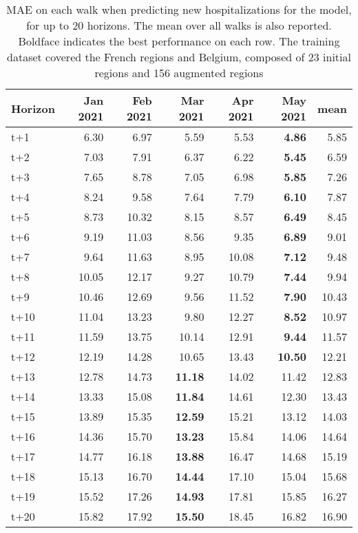 \begin{table}[H]
\centering
\caption{MAE on each walk when predicting new hospitalizations for the model, for up to 20 horizons. The mean over all walks is also reported. Boldface indicates the best performance on each row. The training dataset covered the French regions and Belgium, composed of 23 initial regions and 156 augmented regions }
\label{tab:MAE_walk_assembly}
\begin{tabular}{lrrrrrr}
\toprule
Horizon &  Jan 2021 &  Feb 2021 &  Mar 2021 &  Apr 2021 &  May 2021 &  mean \\
\midrule
t+1  & 6.30  & 6.97  & 5.59  & 5.53  & \textbf{4.86}  & 5.85  \\
t+2  & 7.03  & 7.91  & 6.37  & 6.22  & \textbf{5.45}  & 6.59  \\
t+3  & 7.65  & 8.78  & 7.05  & 6.98  & \textbf{5.85}  & 7.26  \\
t+4  & 8.24  & 9.58  & 7.64  & 7.79  & \textbf{6.10}  & 7.87  \\
t+5  & 8.73  & 10.32  & 8.15  & 8.57  & \textbf{6.49}  & 8.45  \\
t+6  & 9.19  & 11.03  & 8.56  & 9.35  & \textbf{6.89}  & 9.01  \\
t+7  & 9.64  & 11.63  & 8.95  & 10.08  & \textbf{7.12}  & 9.48  \\
t+8  & 10.05  & 12.17  & 9.27  & 10.79  & \textbf{7.44}  & 9.94  \\
t+9  & 10.46  & 12.69  & 9.56  & 11.52  & \textbf{7.90}  & 10.43  \\
t+10  & 11.04  & 13.23  & 9.80  & 12.27  & \textbf{8.52}  & 10.97  \\
t+11  & 11.59  & 13.75  & 10.14  & 12.91  & \textbf{9.44}  & 11.57  \\
t+12  & 12.19  & 14.28  & 10.65  & 13.43  & \textbf{10.50}  & 12.21  \\
t+13  & 12.78  & 14.73  & \textbf{11.18}  & 14.02  & 11.42  & 12.83  \\
t+14  & 13.33  & 15.08  & \textbf{11.84}  & 14.61  & 12.30  & 13.43  \\
t+15  & 13.89  & 15.35  & \textbf{12.59}  & 15.21  & 13.12  & 14.03  \\
t+16  & 14.36  & 15.70  & \textbf{13.23}  & 15.84  & 14.06  & 14.64  \\
t+17  & 14.77  & 16.18  & \textbf{13.88}  & 16.47  & 14.68  & 15.19  \\
t+18  & 15.13  & 16.70  & \textbf{14.44}  & 17.10  & 15.04  & 15.68  \\
t+19  & 15.52  & 17.26  & \textbf{14.93}  & 17.81  & 15.85  & 16.27  \\
t+20  & 15.82  & 17.92  & \textbf{15.50}  & 18.45  & 16.82  & 16.90  \\

\bottomrule
\end{tabular}
\end{table}
